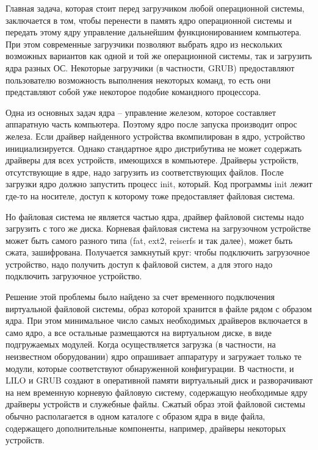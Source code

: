 Главная задача, которая стоит перед загрузчиком любой операционной системы, заключается в том, чтобы перенести в память ядро операционной системы и передать этому ядру управление дальнейшим функционированием компьютера. При этом современные загрузчики позволяют выбрать ядро из нескольких возможных вариантов как одной и той же операционной системы, так и загрузить ядра разных ОС. Некоторые загрузчики (в частности, GRUB) предоставляют пользователю возможность выполнения некоторых команд, то есть они представляют собой уже некоторое подобие командного процессора.

Одна из основных задач ядра -- управление железом, которое составляет аппаратную часть компьютера. Поэтому ядро после запуска производит опрос железа. Если драйвер найденного устройства вкомпилирован в ядро, устройство инициализируется. Однако стандартное ядро дистрибутива не может содержать драйверы для всех устройств, имеющихся в компьютере. Драйверы устройств, отсутствующие в ядре, надо загрузить из соответствующих файлов. После загрузки ядро должно запустить процесс init, который. Код программы init лежит где-то на носителе, доступ к которому тоже предоставляет файловая система.

Но файловая система не является частью ядра, драйвер файловой системы надо загрузить с того же диска. Корневая файловая система на загрузочном устройстве может быть самого разного типа (fat, ext2, reiserfs и так далее), может быть сжата, зашифрована. Получается замкнутый круг: чтобы подключить загрузочное устройство, надо получить доступ к файловой систем, а для этого надо подключить загрузочное устройство.

Решение этой проблемы было найдено за счет временного подключения виртуальной файловой системы, образ которой хранится в файле рядом с образом ядра. При этом минимальное число самых необходимых драйверов включается в само ядро, а все остальные размещаются на виртуальном диске, в виде подгружаемых модулей. Когда осуществляется загрузка (в частности, на неизвестном оборудовании) ядро опрашивает аппаратуру и загружает только те модули, которые соответствуют обнаруженной конфигурации. В частности, и LILO и GRUB создают в оперативной памяти виртуальный диск и разворачивают на нем временную корневую файловую систему, содержащую необходимые ядру драйверы устройств и служебные файлы. Сжатый образ этой файловой системы обычно располагается в одном каталоге с образом ядра в виде файла, содержащего дополнительные компоненты, например, драйверы некоторых устройств.

\newpage

